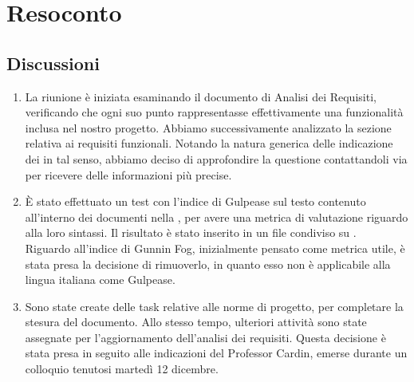 \section{Resoconto} \label{sec:resoconto}
\subsection{Discussioni} \label{subsec:resdiscussione}
\begin{enumerate}
    \item  La riunione è iniziata esaminando il documento di Analisi dei Requisiti, verificando che ogni suo punto rappresentasse effettivamente una funzionalità inclusa nel nostro progetto. Abbiamo successivamente analizzato la sezione relativa ai requisiti funzionali. Notando la natura generica delle indicazione dei  in tal senso, abbiamo deciso di approfondire la questione contattandoli via  per ricevere delle informazioni più precise.
    
    \item È stato effettuato un test con l'indice di Gulpease sul testo contenuto all'interno dei documenti nella , per avere una metrica di valutazione riguardo alla loro sintassi. Il risultato è stato inserito in un file condiviso su . \\
    Riguardo all'indice di Gunnin Fog, inizialmente pensato come metrica utile, è stata presa la decisione di rimuoverlo, in quanto esso non è applicabile alla lingua italiana come Gulpease.

    \item Sono state create delle task relative alle norme di progetto, per completare la stesura del documento. Allo stesso tempo, ulteriori attività sono state assegnate per l'aggiornamento dell'analisi dei requisiti. Questa decisione è stata presa in seguito alle indicazioni del Professor Cardin, emerse durante un colloquio tenutosi martedì 12 dicembre.
    
\end{enumerate}


